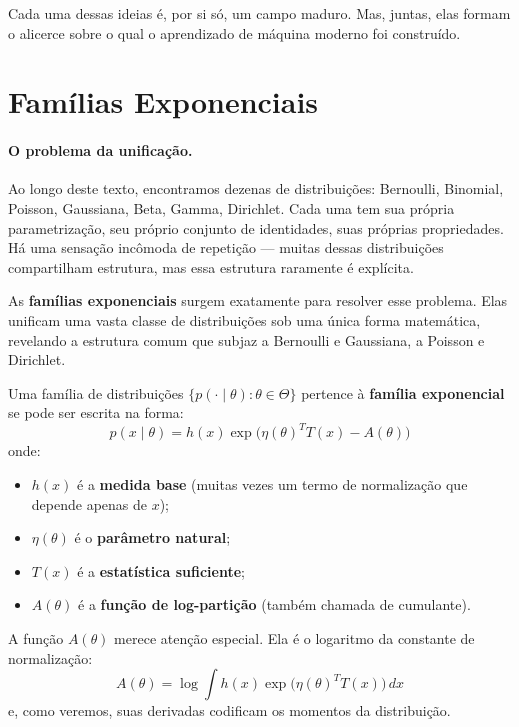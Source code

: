 \documentclass{tufte-handout}
\begin{document}
Cada uma dessas ideias é, por si só, um campo maduro. Mas, juntas, elas formam o alicerce sobre o qual o aprendizado de máquina moderno foi construído.

\section{Famílias Exponenciais}

\paragraph{O problema da unificação.}

Ao longo deste texto, encontramos dezenas de distribuições: Bernoulli, Binomial, Poisson, Gaussiana, Beta, Gamma, Dirichlet. Cada uma tem sua própria parametrização, seu próprio conjunto de identidades, suas próprias propriedades. Há uma sensação incômoda de repetição --- muitas dessas distribuições compartilham estrutura, mas essa estrutura raramente é explícita.

As \textbf{famílias exponenciais} surgem exatamente para resolver esse problema. Elas unificam uma vasta classe de distribuições sob uma única forma matemática, revelando a estrutura comum que subjaz a Bernoulli e Gaussiana, a Poisson e Dirichlet.

\begin{defn}
    Uma família de distribuições $\{p(\cdot \mid \theta) : \theta \in \Theta\}$ pertence à \textbf{família exponencial} se pode ser escrita na forma:
    \[
    p(x \mid \theta) = h(x) \exp\big(\eta(\theta)^T T(x) - A(\theta)\big)
    \]
    onde:
    \begin{itemize}
        \item $h(x)$ é a \textbf{medida base} (muitas vezes um termo de normalização que depende apenas de $x$);
        \item $\eta(\theta)$ é o \textbf{parâmetro natural};
        \item $T(x)$ é a \textbf{estatística suficiente};
        \item $A(\theta)$ é a \textbf{função de log-partição} (também chamada de cumulante).
    \end{itemize}
\end{defn}

A função $A(\theta)$ merece atenção especial. Ela é o logaritmo da constante de normalização:
\[
A(\theta) = \log \int h(x) \exp\big(\eta(\theta)^T T(x)\big) \, dx
\]
e, como veremos, suas derivadas codificam os momentos da distribuição.
\end{document}

